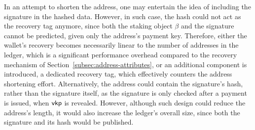 \begin{remark*}
In an attempt to shorten the address, one may entertain the idea
of including the signature in the hashed data. However, in such case, the hash
could not act as the recovery tag anymore, since both the staking object
$\beta$ and the signature cannot be predicted, given only the address's payment
key. Therefore, either the wallet's recovery becomes necessarily linear to the
number of addresses in the ledger, which is a significant performance overhead
compared to the recovery mechanism of Section~\ref{subsec:address-attributes},
or an additional component is introduced, \ie a dedicated recovery tag, which
effectively counters the address shortening effort. Alternatively, the address
could contain the signature's hash, rather than the signature itself, as the
signature is only checked after a payment is issued, \ie when
$\mathsf{vkp}$ is revealed. However, although such design could reduce the
address's length, it would also increase the ledger's overall size, since both
the signature and its hash would be published.
\end{remark*}
